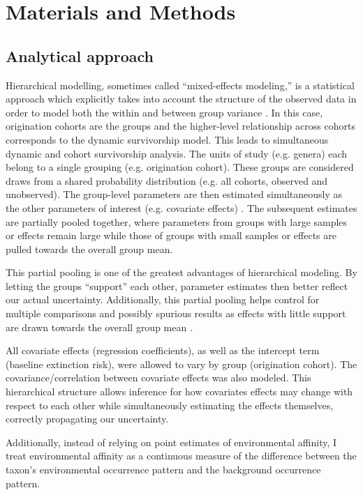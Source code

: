 \documentclass[12pt,letterpaper]{article}
\begin{document}
\section{Materials and Methods}

\subsection{Analytical approach}

Hierarchical modelling, sometimes called ``mixed-effects modeling,'' is a statistical approach which explicitly takes into account the structure of the observed data in order to model both the within and between group variance \citep{Gelman2013d,Gelman2007}. In this case, origination cohorts are the groups and the higher-level relationship across cohorts corresponds to the dynamic survivorship model. This leads to simultaneous dynamic and cohort survivorship analysis. The units of study (e.g. genera) each belong to a single grouping (e.g. origination cohort). These groups are considered draws from a shared probability distribution (e.g. all cohorts, observed and unobserved). The group-level parameters are then estimated simultaneously as the other parameters of interest (e.g. covariate effects) \citep{Gelman2013d}. The subsequent estimates are partially pooled together, where parameters from groups with large samples or effects remain large while those of groups with small samples or effects are pulled towards the overall group mean. 

This partial pooling is one of the greatest advantages of hierarchical modeling. By letting the groups ``support'' each other, parameter estimates then better reflect our actual uncertainty. Additionally, this partial pooling helps control for multiple comparisons and possibly spurious results as effects with little support are drawn towards the overall group mean \citep{Gelman2013d,Gelman2007}. 

All covariate effects (regression coefficients), as well as the intercept term (baseline extinction risk), were allowed to vary by group (origination cohort). The covariance/correlation between covariate effects was also modeled. This hierarchical structure allows inference for how covariates effects may change with respect to each other while simultaneously estimating the effects themselves, correctly propagating our uncertainty. 

Additionally, instead of relying on point estimates of environmental affinity, I treat environmental affinity as a continuous measure of the difference between the taxon's environmental occurrence pattern and the background occurrence pattern.
\end{document}
